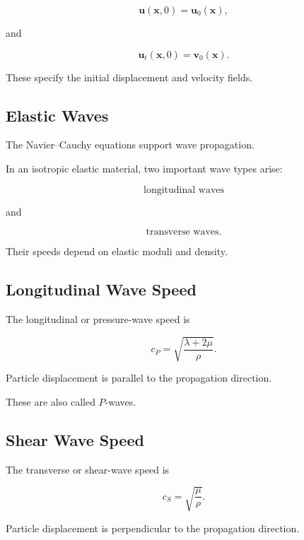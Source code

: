 \[
\boxed{
\mathbf{u}(\mathbf{x},0)
=
\mathbf{u}_0(\mathbf{x}),
}
\]

and

\[
\boxed{
\mathbf{u}_t(\mathbf{x},0)
=
\mathbf{v}_0(\mathbf{x}).
}
\]

These specify the initial displacement and velocity fields.

\subsection{Elastic Waves}
\label{subsec:elastic-waves}

The Navier--Cauchy equations support wave propagation.

In an isotropic elastic material, two important wave types arise:

\[
\boxed{
\text{longitudinal waves}
}
\]

and

\[
\boxed{
\text{transverse waves}.
}
\]

Their speeds depend on elastic moduli and density.

\subsection{Longitudinal Wave Speed}
\label{subsec:longitudinal-wave-speed}

The longitudinal or pressure-wave speed is

\[
\boxed{
c_P
=
\sqrt{
\frac{\lambda+2\mu}
{\rho}
}.
}
\]

Particle displacement is parallel to the propagation direction.

These are also called \(P\)-waves.

\subsection{Shear Wave Speed}
\label{subsec:shear-wave-speed}

The transverse or shear-wave speed is

\[
\boxed{
c_S
=
\sqrt{
\frac{\mu}{\rho}
}.
}
\]

Particle displacement is perpendicular to the propagation direction.

